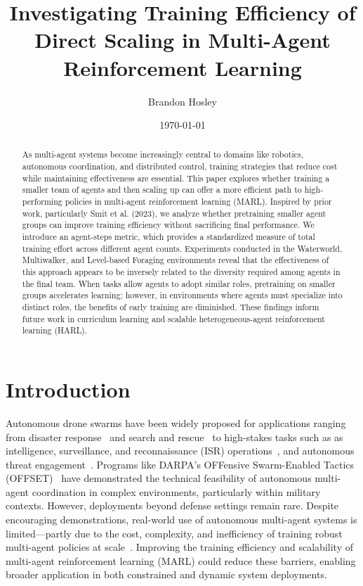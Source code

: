 \documentclass{article}
\title{Investigating Training Efficiency of Direct Scaling in Multi-Agent Reinforcement Learning}
\author{Brandon Hosley}
\date{\today}
\begin{document}
\maketitle

\begin{abstract}
    As multi-agent systems become increasingly central to domains like robotics, 
    autonomous coordination, and distributed control, training strategies 
    that reduce cost while maintaining effectiveness are essential. 
    This paper explores whether training a smaller team of agents and 
    then scaling up can offer a more efficient path to high-performing policies in 
    multi-agent reinforcement learning (MARL).
    Inspired by prior work, particularly Smit et al. (2023), 
    we analyze whether pretraining smaller agent groups can improve training efficiency 
    without sacrificing final performance. 
    We introduce an agent-steps metric, which provides a standardized measure of 
    total training effort across different agent counts.
    Experiments conducted in the Waterworld, Multiwalker, and Level-based Foraging environments 
    reveal that the effectiveness of this approach appears to be inversely related 
    to the diversity required among agents in the final team. 
    When tasks allow agents to adopt similar roles, 
    pretraining on smaller groups accelerates learning; 
    however, in environments where agents must specialize into distinct roles, 
    the benefits of early training are diminished. 
    These findings inform future work in curriculum learning and scalable 
    heterogeneous-agent reinforcement learning (HARL).
\end{abstract}

\section{Introduction}

Autonomous drone swarms have been widely proposed for applications ranging from 
disaster response~\cite{mohddaud2022} and search and rescue~\cite{mohddaud2022} 
to high-stakes tasks such as as intelligence, surveillance, and reconnaissance 
(ISR) operations~\cite{hambling2021}, and autonomous threat 
engagement~\cite{rogers2022, kallenborn2024}. 
Programs like DARPA's OFFensive Swarm-Enabled Tactics (OFFSET)~\cite{zotero-2835} 
have demonstrated the technical feasibility of autonomous multi-agent coordination 
in complex environments, particularly within military contexts. However, 
deployments beyond defense settings remain rare. Despite encouraging demonstrations, 
real-world use of autonomous multi-agent systems is limited—partly due to the cost, 
complexity, and inefficiency of training robust multi-agent policies at scale~\cite{jin2025}. 
Improving the training efficiency and scalability of multi-agent reinforcement 
learning (MARL) could reduce these barriers, enabling broader application in both 
constrained and dynamic system deployments.
\end{document}
